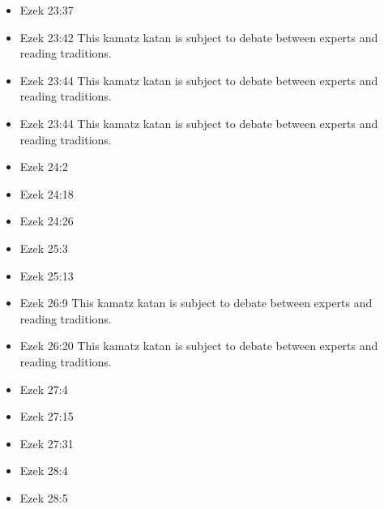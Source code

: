 \documentclass[14pt]{book}
\begin{document}
\begin{multicols}{2}
\begin{itemize}
												\item Ezek 23:37
												
												\item Ezek 23:42 This kamatz katan is subject to debate between experts and reading traditions.
												
												\item Ezek 23:44 This kamatz katan is subject to debate between experts and reading traditions.
												
												\item Ezek 23:44 This kamatz katan is subject to debate between experts and reading traditions.
												
												\item Ezek 24:2
												
												\item Ezek 24:18
												
												\item Ezek 24:26
												
												\item Ezek 25:3
												
												\item Ezek 25:13
												
												\item Ezek 26:9 This kamatz katan is subject to debate between experts and reading traditions.
												
												\item Ezek 26:20 This kamatz katan is subject to debate between experts and reading traditions.
												
												\item Ezek 27:4
												
												\item Ezek 27:15
												
												\item Ezek 27:31
												
												\item Ezek 28:4
												
												\item Ezek 28:5
												

\end{itemize}
\end{multicols}
\end{document}
